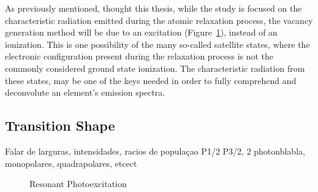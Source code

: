 As previously mentioned, thought this thesis, while the study is focused on the characteristic radiation emitted during the atomic relaxation process, the vacancy generation method will be due to an excitation (Figure~\ref{fig:exc}), instead of an ionization. This is one possibility of the many so-called satellite states, where the electronic configuration present during the relaxation process is not the commonly considered ground state ionization.
The characteristic radiation from these states, may be one of the keys needed in order to fully comprehend and deconvolute an element's emission spectra.


\subsection{Transition Shape}


Falar de larguras, intensidades, racios de populaçao P1/2 P3/2, 2 photonblabla, monopolares, quadrapolares, etcect





\begin{figure}[h!]
    \centering
    \caption{Resonant Photoexcitation}\label{fig:exc}
\end{figure}


